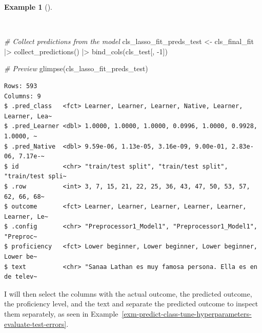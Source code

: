 \documentclass[
  letterpaper,
  krantz1]{latex/krantz-mod}
\newenvironment{Shaded}{\begin{snugshade}}{\end{snugshade}}
\newcommand{\CommentTok}[1]{\textcolor[rgb]{0.00,0.00,0.00}{\textit{#1}}}
\newcommand{\DecValTok}[1]{\textcolor[rgb]{0.00,0.00,0.00}{#1}}
\newcommand{\FunctionTok}[1]{\textcolor[rgb]{0.00,0.00,0.00}{#1}}
\newcommand{\NormalTok}[1]{\textcolor[rgb]{0.00,0.00,0.00}{#1}}
\newcommand{\OtherTok}[1]{\textcolor[rgb]{0.00,0.00,0.00}{#1}}
\newcommand{\SpecialCharTok}[1]{\textcolor[rgb]{0.00,0.00,0.00}{#1}}
\theoremstyle{definition}
\newtheorem{example}{Example}[chapter]
\theoremstyle{definition}
\theoremstyle{remark}
\begin{document}
\begin{example}[]\protect\hypertarget{exm-predict-class-tune-hyperparameters-integrate-test}{}\label{exm-predict-class-tune-hyperparameters-integrate-test}

~

\begin{Shaded}
\begin{Highlighting}[numbers=left,,]
\CommentTok{\# Collect predictions from the model}
\NormalTok{cls\_lasso\_fit\_preds\_test }\OtherTok{\textless{}{-}}
\NormalTok{  cls\_final\_fit }\SpecialCharTok{|\textgreater{}}
  \FunctionTok{collect\_predictions}\NormalTok{() }\SpecialCharTok{|\textgreater{}}
  \FunctionTok{bind\_cols}\NormalTok{(cls\_test[, }\SpecialCharTok{{-}}\DecValTok{1}\NormalTok{])}

\CommentTok{\# Preview}
\FunctionTok{glimpse}\NormalTok{(cls\_lasso\_fit\_preds\_test)}
\end{Highlighting}
\end{Shaded}

\begin{verbatim}
Rows: 593
Columns: 9
$ .pred_class   <fct> Learner, Learner, Learner, Native, Learner, Learner, Lea~
$ .pred_Learner <dbl> 1.0000, 1.0000, 1.0000, 0.0996, 1.0000, 0.9928, 1.0000, ~
$ .pred_Native  <dbl> 9.59e-06, 1.13e-05, 3.16e-09, 9.00e-01, 2.83e-06, 7.17e-~
$ id            <chr> "train/test split", "train/test split", "train/test spli~
$ .row          <int> 3, 7, 15, 21, 22, 25, 36, 43, 47, 50, 53, 57, 62, 66, 68~
$ outcome       <fct> Learner, Learner, Learner, Learner, Learner, Learner, Le~
$ .config       <chr> "Preprocessor1_Model1", "Preprocessor1_Model1", "Preproc~
$ proficiency   <fct> Lower beginner, Lower beginner, Lower beginner, Lower be~
$ text          <chr> "Sanaa Lathan es muy famosa persona. Ella es en de telev~
\end{verbatim}

\end{example}

I will then select the columns with the actual outcome, the predicted
outcome, the proficiency level, and the text and separate the predicted
outcome to inspect them separately, as seen in
Example~\ref{exm-predict-class-tune-hyperparameters-evaluate-test-errors}.
\end{document}

